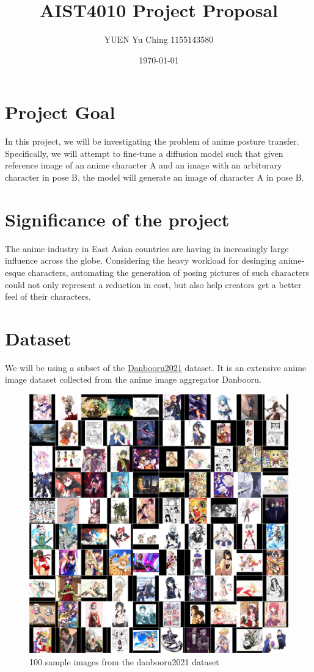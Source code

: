 \documentclass{article}
\title{AIST4010 Project Proposal}
\author{YUEN Yu Ching 1155143580}
\date{\today}
\begin{document}
\maketitle
\section{Project Goal}
In this project, we will be investigating the problem of anime posture transfer. Specifically, we will attempt to fine-tune a diffusion model such that given reference image of an anime character A and an image with an arbiturary character in pose B, the model will generate an image of character A in pose B.

\section{Significance of the project}
The anime industry in East Asian countries are having in increasingly large influence across the globe. Considering the heavy workload for desinging anime-esque characters, automating the generation of posing pictures of such characters could not only represent a reduction in cost, but also help creators get a better feel of their characters.

\section{Dataset}
We will be using a subset of the \href{https://gwern.net/danbooru2021}{Danbooru2021} \cite{danbooru2021} dataset. It is an extensive anime image dataset collected from the anime image aggregator Danbooru.\\

\begin{figure}
\centering
\includegraphics[scale=0.1]{danbooru2020-512px-samples.jpg}
\caption{100 sample images from the danbooru2021 dataset}
\end{figure}
\end{document}
